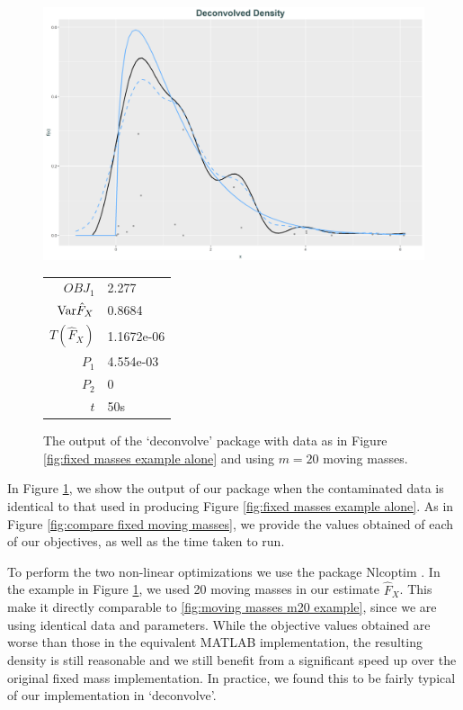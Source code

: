 \begin{figure}
	\centering
	\includegraphics[width = \textwidth]{Figures/Deconvolution/R_example.png}
	\begin{tabular}{r l}
			$OBJ_1$ & 2.277\\
			$\mathrm{Var} \hat{F}_X$ & 0.8684\\
			$T(\hat{F}_X)$ & 1.1672e-06\\
			$P_1$ & 4.554e-03\\
			$P_2$ & 0\\
			$t$ & 50s
		\end{tabular}
	\caption{The output of the `deconvolve' package with data as in Figure \ref{fig:fixed masses example alone} and using $m=20$ moving masses.}
	\label{fig:R example}
\end{figure}

In Figure \ref{fig:R example}, we show the output of our package when the contaminated data is identical to that used in producing Figure \ref{fig:fixed masses example alone}. As in Figure \ref{fig:compare fixed moving masses}, we provide the values obtained of each of our objectives, as well as the time taken to run.

To perform the two non-linear optimizations we use the package Nlcoptim \cite{Chen2017-mn}. In the example in Figure \ref{fig:R example}, we used 20 moving masses in our estimate $\hat{F}_X$. This make it directly comparable to \ref{fig:moving masses m20 example}, since we are using identical data and parameters. While the objective values obtained are worse than those in the equivalent MATLAB implementation, the resulting density is still reasonable and we still benefit from a significant speed up over the original fixed mass implementation. In practice, we found this to be fairly typical of our implementation in `deconvolve'. 

